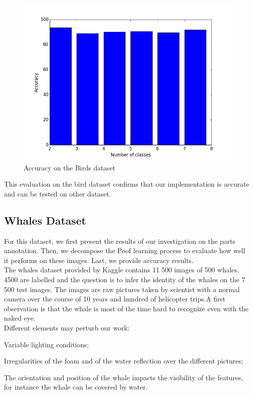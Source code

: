 \documentclass[twoside]{article}
\begin{document}
\begin{multicols}{2}
\begin{figure}[H]
	\includegraphics[scale=0.35]{img/acc_b.png}
	\centering
	\caption{Accuracy on the Birds dataset}
	\label{fig:fig_acc_b}
\end{figure}


This evaluation on the bird dataset confirms that our implementation is accurate and can be tested on other dataset.

\subsection{Whales Dataset}

For this dataset, we first present the results of our investigation on the parts annotation. Then, we decompose the Poof learning process to evaluate how well it performs on these images. Last, we provide accuracy results.\\

The whales dataset provided by Kaggle contains 11 500 images of 500 whales, 4500 are labelled and the question is to infer the identity of the whales on the 7 500 test images. The images are raw pictures taken by scientist with a normal camera over the course of 10 years and hundred of helicopter trips.A first observation is that the whale is most of the time hard to recognize even with the naked eye.\\

Different elements may perturb our work:
\begin{compactitem}
	\item Variable lighting conditions;
	\item Irregularities of the foam and of the water reflection over the different pictures;
	\item The orientation and position of the whale impacts the visibility of the features, for instance the whale can be covered by water.
\end{compactitem}


\end{multicols}
\end{document}
